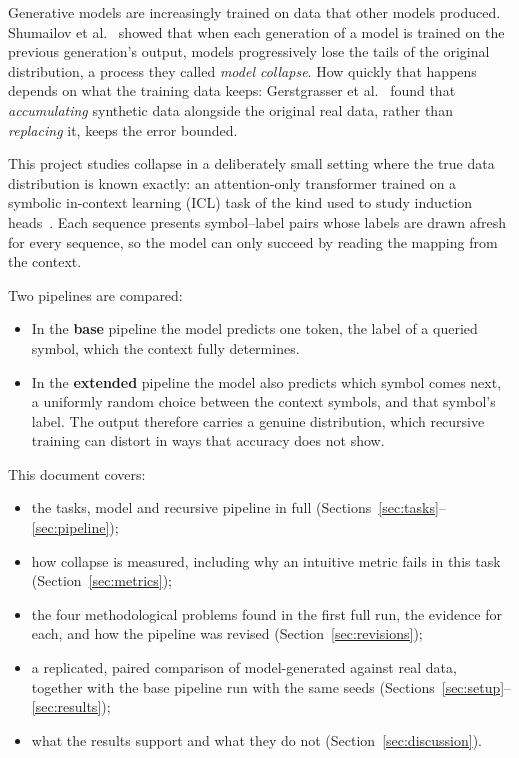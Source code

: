 \documentclass[11pt,a4paper]{article}
\begin{document}
Generative models are increasingly trained on data that other models
produced. Shumailov et al.~\cite{shumailov2024} showed that when each
generation of a model is trained on the previous generation's output, models
progressively lose the tails of the original distribution, a process they
called \emph{model collapse}. How quickly that happens depends on what the
training data keeps: Gerstgrasser et al.~\cite{gerstgrasser2024} found that
\emph{accumulating} synthetic data alongside the original real data, rather
than \emph{replacing} it, keeps the error bounded.

This project studies collapse in a deliberately small setting where the true
data distribution is known exactly: an attention-only transformer trained on
a symbolic in-context learning (ICL) task of the kind used to study induction
heads~\cite{olsson2022,singh2024}. Each sequence presents symbol--label pairs
whose labels are drawn afresh for every sequence, so the model can only
succeed by reading the mapping from the context.

Two pipelines are compared:
\begin{itemize}[leftmargin=1.4em]
  \item In the \textbf{base} pipeline the model predicts one token, the label
        of a queried symbol, which the context fully determines.
  \item In the \textbf{extended} pipeline the model also predicts which symbol
        comes next, a uniformly random choice between the context symbols,
        and that symbol's label. The output therefore carries a genuine
        distribution, which recursive training can distort in ways that
        accuracy does not show.
\end{itemize}

\noindent This document covers:
\begin{itemize}[leftmargin=1.4em]
  \item the tasks, model and recursive pipeline in full (Sections~\ref{sec:tasks}--\ref{sec:pipeline});
  \item how collapse is measured, including why an intuitive metric fails in
        this task (Section~\ref{sec:metrics});
  \item the four methodological problems found in the first full run, the
        evidence for each, and how the pipeline was revised
        (Section~\ref{sec:revisions});
  \item a replicated, paired comparison of model-generated against real data,
        together with the base pipeline run with the same seeds
        (Sections~\ref{sec:setup}--\ref{sec:results});
  \item what the results support and what they do not
        (Section~\ref{sec:discussion}).
\end{itemize}
\end{document}
